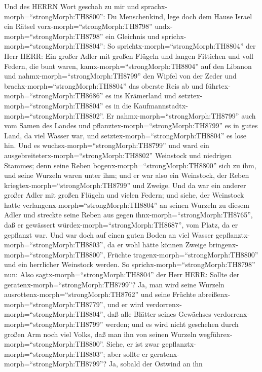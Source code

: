 Und des HERRN Wort geschah zu mir und
sprachx-morph=``strongMorph:TH8800'':  Du Menschenkind, lege
doch dem Hause Israel ein Rätsel vorx-morph=``strongMorph:TH8798''
undx-morph=``strongMorph:TH8798'' ein Gleichnis  und
sprichx-morph=``strongMorph:TH8804'': So
sprichtx-morph=``strongMorph:TH8804'' der Herr HERR: Ein großer Adler
mit großen Flügeln und langen Fittichen und voll Federn, die bunt waren,
kamx-morph=``strongMorph:TH8804'' auf den Libanon und
nahmx-morph=``strongMorph:TH8799'' den Wipfel von der Zeder 
und brachx-morph=``strongMorph:TH8804'' das oberste Reis ab und
führtex-morph=``strongMorph:TH8686'' es ins Krämerland und
setztex-morph=``strongMorph:TH8804'' es in die
Kaufmannstadtx-morph=``strongMorph:TH8802''.  Er
nahmx-morph=``strongMorph:TH8799'' auch vom Samen des Landes und
pflanztex-morph=``strongMorph:TH8799'' es in gutes Land, da viel Wasser
war, und setztex-morph=``strongMorph:TH8804'' es lose hin. 
Und es wuchsx-morph=``strongMorph:TH8799'' und ward ein
ausgebreiteterx-morph=``strongMorph:TH8802'' Weinstock und niedrigen
Stammes; denn seine Reben bogenx-morph=``strongMorph:TH8800'' sich zu
ihm, und seine Wurzeln waren unter ihm; und er war also ein Weinstock,
der Reben kriegtex-morph=``strongMorph:TH8799'' und Zweige. 
Und da war ein anderer großer Adler mit großen Flügeln und vielen
Federn; und siehe, der Weinstock hatte
verlangenx-morph=``strongMorph:TH8804'' an seinen Wurzeln zu diesem
Adler und streckte seine Reben aus gegen
ihnx-morph=``strongMorph:TH8765'', daß er gewässert
würdex-morph=``strongMorph:TH8687'', vom Platz, da er gepflanzt war.
 Und war doch auf einen guten Boden an viel Wasser
gepflanztx-morph=``strongMorph:TH8803'', da er wohl hätte können Zweige
bringenx-morph=``strongMorph:TH8800'', Früchte
tragenx-morph=``strongMorph:TH8800'' und ein herrlicher Weinstock
werden.  So sprichx-morph=``strongMorph:TH8798'' nun: Also
sagtx-morph=``strongMorph:TH8804'' der Herr HERR: Sollte der
geratenx-morph=``strongMorph:TH8799''? Ja, man wird seine Wurzeln
ausrottenx-morph=``strongMorph:TH8762'' und seine Früchte
abreißenx-morph=``strongMorph:TH8779'', und er wird
verdorrenx-morph=``strongMorph:TH8804'', daß alle Blätter seines
Gewächses verdorrenx-morph=``strongMorph:TH8799'' werden; und es wird
nicht geschehen durch großen Arm noch viel Volks, daß man ihn von seinen
Wurzeln wegführex-morph=``strongMorph:TH8800''.  Siehe, er
ist zwar gepflanztx-morph=``strongMorph:TH8803''; aber sollte er
geratenx-morph=``strongMorph:TH8799''? Ja, sobald der Ostwind an ihn
